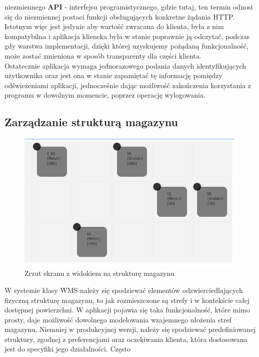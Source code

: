 		niezmiennego \textbf{API} - interfejsu programistycznego, gdzie tutaj, ten termin odnosi się
		do niezmiennej postaci funkcji obsługujących konkretne żądania HTTP.
		Istotnym więc jest jedynie aby wartość zwracana do klienta, była
		z nim kompatybilna i aplikacja kliencka była w stanie poprawnie ją odczytać, podczas gdy warstwa
		implementacji, dzięki której uzyskujemy pożądaną funkcjonalność,
		może zostać zmieniona w sposób transparenty dla części klienta. \\
		Ostatecznie aplikacja wymaga jednorazowego podania danych identyfikujących użytkownika oraz
		jest ona w stanie zapamiętać tę informację pomiędzy odświeżeniami aplikacji, jednocześnie
		dając możliwość zakończenia korzystania z programu w dowolnym momencie, poprzez operację
		wylogowania.
		
	\subsection{Zarządzanie strukturą magazynu}
		\begin{figure}[H]
			\centering
			\includegraphics[width=0.99\textwidth]{images/app/unit_preview}
			\caption[Aplikacja - Zarządzania strukturą magazynu]{Zrzut ekranu z widokiem na strukturę magazynu}
			\label{c7:fig:app:unit_preview}
		\end{figure}
		W systemie klasy WMS należy się spodziewać elementów odzwierciedlających fizyczną strukturę magazynu,
		to jak rozmieszczone są strefy i w kontekście całej dostępnej powierzchni. W aplikacji pojawia się taka
		funkcjonalność, które mimo prosty, daje możliwość dowolnego modelowania wzajemnego ułożenia stref
		magazynu. Niemniej w produkcyjnej wersji, należy się spodziewać predefiniowanej struktury, zgodnej z
		preferencjami oraz oczekiwania klienta, która dostosowana jest do specyfiki jego działalności. Często
